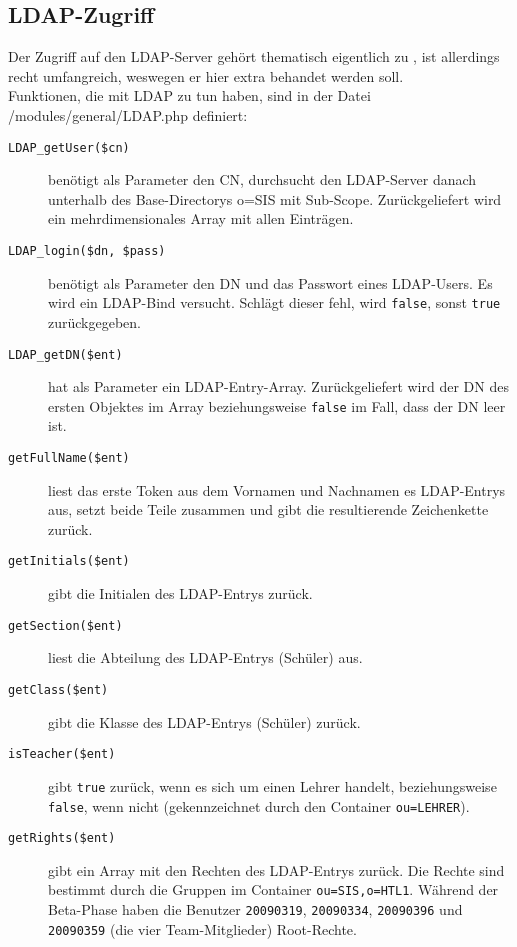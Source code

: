 \subsection{LDAP-Zugriff}
\label{sec:content_imple_ldap}
Der Zugriff auf den LDAP-Server gehört thematisch eigentlich zu , ist allerdings recht umfangreich, weswegen er hier extra behandet werden soll.\\
Funktionen, die mit LDAP zu tun haben, sind in der Datei /modules/general/LDAP.php definiert:
\begin{description}
	\item[\texttt{LDAP\_getUser(\$cn)}] benötigt als Parameter den CN, durchsucht den LDAP-Server danach unterhalb des Base-Directorys o=SIS mit Sub-Scope. Zurückgeliefert wird ein mehrdimensionales Array mit allen Einträgen.
	\item[\texttt{LDAP\_login(\$dn, \$pass)}] benötigt als Parameter den DN und das Passwort eines LDAP-Users. Es wird ein LDAP-Bind versucht. Schlägt dieser fehl, wird \texttt{false}, sonst \texttt{true} zurückgegeben.
	\item[\texttt{LDAP\_getDN(\$ent)}] hat als Parameter ein LDAP-Entry-Array. Zurückgeliefert wird der DN des ersten Objektes im Array beziehungsweise \texttt{false} im Fall, dass der DN leer ist.
	\item[\texttt{getFullName(\$ent)}] liest das erste Token aus dem Vornamen und Nachnamen es LDAP-Entrys aus, setzt beide Teile zusammen und gibt die resultierende Zeichenkette zurück.
	\item[\texttt{getInitials(\$ent)}] gibt die Initialen des LDAP-Entrys zurück.
	\item[\texttt{getSection(\$ent)}] liest die Abteilung des LDAP-Entrys (Schüler) aus.
	\item[\texttt{getClass(\$ent)}] gibt die Klasse des LDAP-Entrys (Schüler) zurück.
	\item[\texttt{isTeacher(\$ent)}] gibt \texttt{true} zurück, wenn es sich um einen Lehrer handelt, beziehungsweise \texttt{false}, wenn nicht (gekennzeichnet durch den Container \texttt{ou=LEHRER}).
	\item[\texttt{getRights(\$ent)}] gibt ein Array mit den Rechten des LDAP-Entrys zurück. Die Rechte sind bestimmt durch die Gruppen im Container \texttt{ou=SIS,o=HTL1}. Während der Beta-Phase haben die Benutzer \texttt{20090319}, \texttt{20090334}, \texttt{20090396} und \texttt{20090359} (die vier Team-Mitglieder) Root-Rechte.
\end{description}


